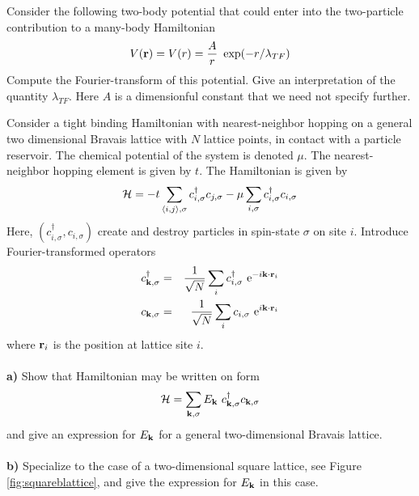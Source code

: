 \begin{problem}
	
	Consider the following two-body potential that could enter into the two-particle contribution to a many-body Hamiltonian
	\begin{eqnarray}
		V({\bf r}) = V(r) = \frac{A}{r} ~ \exp(-r/\lambda_{TF}) \nonumber 
	\end{eqnarray} 
	Compute the Fourier-transform of this potential. Give an interpretation of the quantity $\lambda_{TF}$. Here $A$ is a dimensionful constant that we need not specify further. 
\end{problem}


\begin{problem}
	
	Consider a tight binding Hamiltonian with nearest-neighbor hopping on a general two dimensional Bravais lattice with $N$ lattice points, in contact with a particle reservoir. The chemical potential of the system is denoted $\mu$. The nearest-neighbor hopping element is given by $t$. The Hamiltonian is given by 
	\begin{eqnarray}
		\mathcal{H} = - t \sum_{\langle i,j \rangle, \sigma} c^{\dagger}_{i,\sigma} c_{j,\sigma} - \mu   \sum_{ i, \sigma} c^{\dagger}_{i,\sigma} c_{i,\sigma} \nonumber 
	\end{eqnarray}
	Here, $(c^{\dagger}_{i,\sigma}, c_{i,\sigma})$ create and destroy particles in spin-state $\sigma$ on site $i$. 
	Introduce Fourier-transformed operators 
	\begin{eqnarray}
		c^{\dagger}_{{\bf k},\sigma} & = & \frac{1}{\sqrt{N}} \sum_{i} c^{\dagger}_{i,\sigma} ~ \mathrm{e}^{-i {\bf k} \cdot {\bf r}_i} \nonumber  \\
		c_{{\bf k},\sigma} & = & \frac{1}{\sqrt{N}} \sum_{i} c_{i,\sigma} ~ \mathrm{e}^{i {\bf k} \cdot {\bf r}_i} \nonumber
	\end{eqnarray}
	where ${\bf r}_i$ is the position at lattice site $i$. 
	\ \\
	\ \\
	{\bf a)} Show that Hamiltonian may be written on form
	\begin{eqnarray}
		\mathcal{H} = \sum_{{\bf k}, \sigma} E_{\bf k} ~ c^{\dagger}_{{\bf k},\sigma} c_{{\bf k},\sigma}  \nonumber 
	\end{eqnarray}
	and give an expression for $E_{\bf k}$ for a general two-dimensional Bravais lattice. 
	\ \\
	\ \\
	{\bf b)} Specialize to the case of a two-dimensional square lattice, see Figure \ref{fig:squareblattice}, and give the expression for $E_{\bf k}$ in this case.
	

\end{problem}
